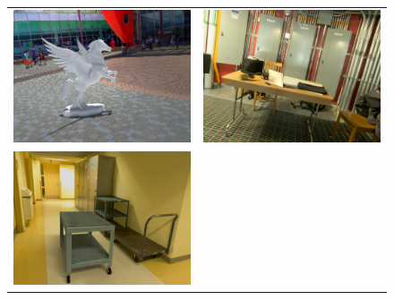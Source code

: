 \newcommand{\voiwidth}{0.47}
\begin{figure}
\centering
\begin{tabular}{@{}cc@{}}
\includegraphics[width=\voiwidth\linewidth]{figures/applications/virtual_object_insertions/pano_abpaafvavryivl_jpg-2_1_es.png} &
\includegraphics[width=\voiwidth\linewidth]{figures/applications/virtual_object_insertions/scene13_compose.jpg} \\
\includegraphics[width=\voiwidth\linewidth]{figures/applications/virtual_object_insertions/scene134_compose.jpg} &

\end{tabular}
\end{figure}
